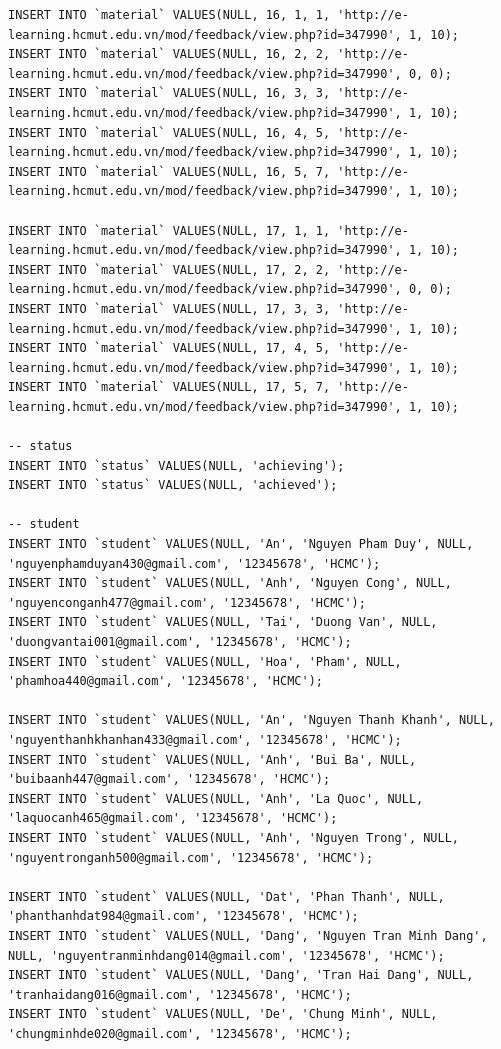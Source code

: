\documentclass[12pt,a4paper,titlepage]{article}
\begin{document}
\begin{lstlisting}
INSERT INTO `material` VALUES(NULL, 16, 1, 1, 'http://e-learning.hcmut.edu.vn/mod/feedback/view.php?id=347990', 1, 10);
INSERT INTO `material` VALUES(NULL, 16, 2, 2, 'http://e-learning.hcmut.edu.vn/mod/feedback/view.php?id=347990', 0, 0);
INSERT INTO `material` VALUES(NULL, 16, 3, 3, 'http://e-learning.hcmut.edu.vn/mod/feedback/view.php?id=347990', 1, 10);
INSERT INTO `material` VALUES(NULL, 16, 4, 5, 'http://e-learning.hcmut.edu.vn/mod/feedback/view.php?id=347990', 1, 10);
INSERT INTO `material` VALUES(NULL, 16, 5, 7, 'http://e-learning.hcmut.edu.vn/mod/feedback/view.php?id=347990', 1, 10);

INSERT INTO `material` VALUES(NULL, 17, 1, 1, 'http://e-learning.hcmut.edu.vn/mod/feedback/view.php?id=347990', 1, 10);
INSERT INTO `material` VALUES(NULL, 17, 2, 2, 'http://e-learning.hcmut.edu.vn/mod/feedback/view.php?id=347990', 0, 0);
INSERT INTO `material` VALUES(NULL, 17, 3, 3, 'http://e-learning.hcmut.edu.vn/mod/feedback/view.php?id=347990', 1, 10);
INSERT INTO `material` VALUES(NULL, 17, 4, 5, 'http://e-learning.hcmut.edu.vn/mod/feedback/view.php?id=347990', 1, 10);
INSERT INTO `material` VALUES(NULL, 17, 5, 7, 'http://e-learning.hcmut.edu.vn/mod/feedback/view.php?id=347990', 1, 10);

-- status
INSERT INTO `status` VALUES(NULL, 'achieving');
INSERT INTO `status` VALUES(NULL, 'achieved');

-- student
INSERT INTO `student` VALUES(NULL, 'An', 'Nguyen Pham Duy', NULL, 'nguyenphamduyan430@gmail.com', '12345678', 'HCMC');
INSERT INTO `student` VALUES(NULL, 'Anh', 'Nguyen Cong', NULL, 'nguyenconganh477@gmail.com', '12345678', 'HCMC');
INSERT INTO `student` VALUES(NULL, 'Tai', 'Duong Van', NULL, 'duongvantai001@gmail.com', '12345678', 'HCMC');
INSERT INTO `student` VALUES(NULL, 'Hoa', 'Pham', NULL, 'phamhoa440@gmail.com', '12345678', 'HCMC');

INSERT INTO `student` VALUES(NULL, 'An', 'Nguyen Thanh Khanh', NULL, 'nguyenthanhkhanhan433@gmail.com', '12345678', 'HCMC');
INSERT INTO `student` VALUES(NULL, 'Anh', 'Bui Ba', NULL, 'buibaanh447@gmail.com', '12345678', 'HCMC');
INSERT INTO `student` VALUES(NULL, 'Anh', 'La Quoc', NULL, 'laquocanh465@gmail.com', '12345678', 'HCMC');
INSERT INTO `student` VALUES(NULL, 'Anh', 'Nguyen Trong', NULL, 'nguyentronganh500@gmail.com', '12345678', 'HCMC');

INSERT INTO `student` VALUES(NULL, 'Dat', 'Phan Thanh', NULL, 'phanthanhdat984@gmail.com', '12345678', 'HCMC');
INSERT INTO `student` VALUES(NULL, 'Dang', 'Nguyen Tran Minh Dang', NULL, 'nguyentranminhdang014@gmail.com', '12345678', 'HCMC');
INSERT INTO `student` VALUES(NULL, 'Dang', 'Tran Hai Dang', NULL, 'tranhaidang016@gmail.com', '12345678', 'HCMC');
INSERT INTO `student` VALUES(NULL, 'De', 'Chung Minh', NULL, 'chungminhde020@gmail.com', '12345678', 'HCMC');


\end{lstlisting}
\end{document}
